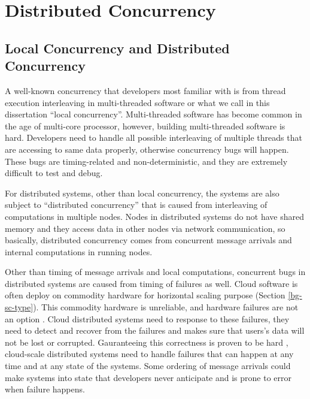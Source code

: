 \section{Distributed Concurrency}
\label{bg-dc}

\subsection{Local Concurrency and Distributed Concurrency}



A well-known concurrency that developers most familiar with is from thread
execution interleaving in multi-threaded software or what we call in this
dissertation ``local concurrency''. Multi-threaded software has become common in
the age of multi-core processor, however, building multi-threaded software is
hard. Developers need to handle all possible interleaving of multiple threads
that are accessing to same data properly, otherwise concurrency bugs will
happen. These bugs are timing-related and non-deterministic, and they are
extremely difficult to test and debug.

For distributed systems, other than local concurrency, the systems are also
subject to ``distributed concurrency'' that is caused from interleaving of
computations in multiple nodes. Nodes in distributed systems do not have shared
memory and they access data in other nodes via network communication, so
basically, distributed concurrency comes from concurrent message arrivals and
internal computations in running nodes.

Other than timing of message arrivals and local computations, concurrent bugs
in distributed systems are caused from timing of failures as well. Cloud
software is often deploy on commodity hardware for horizontal scaling purpose
(Section \ref{bg-sc-type}). This commodity hardware is unreliable, and hardware
failures are not an option \cite{Abadi09-Cloud, Gunawi+11-FaaS-TR,
Hamilton07-Deploying}. Cloud distributed systems need to response to these
failures, they need to detect and recover from the failures and makes sure that
users's data will not be lost or corrupted. Gauranteeing this correctness is
proven to be hard \cite{Do+14-Phd, Gunawi+11-FateDestini}, cloud-scale distributed
systems need to handle failures that can happen at any time and at any state of
the systems. Some ordering of message arrivals could make systems into state
that developers never anticipate and is prone to error when failure happens.

